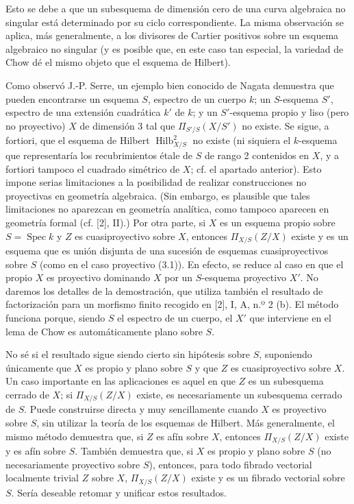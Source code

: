 Esto se debe a que un subesquema de dimensión cero de una curva algebraica no
singular está determinado por su ciclo correspondiente. La misma observación
se aplica, más generalmente, a los divisores de Cartier positivos sobre un
esquema algebraico no singular (y es posible que, en este caso tan especial,
la variedad de Chow dé el mismo objeto que el esquema de Hilbert).


Como observó J.-P. Serre, un ejemplo bien conocido de Nagata demuestra que
pueden encontrarse un esquema $S$, espectro de un cuerpo $k$; un $S$-esquema
$S'$, espectro de una extensión cuadrática $k'$ de $k$; y un $S'$-esquema
propio y liso (pero no proyectivo) $X$ de dimensión 3 tal que
$\Pi_{S'/S}(X/S')$ no existe. Se sigue, a fortiori, que el esquema de
Hilbert $\operatorname{Hilb}^2_{X/S}$ no existe (ni siquiera el $k$-esquema
que representaría los recubrimientos étale de $S$ de rango 2 contenidos en
$X$, y a fortiori tampoco el cuadrado simétrico de $X$; cf. el apartado
anterior). Esto impone serias limitaciones a la posibilidad de realizar
construcciones no proyectivas en geometría algebraica. (Sin embargo, es
plausible que tales limitaciones no aparezcan en geometría analítica, como
tampoco aparecen en geometría formal (cf. [2], II).) Por otra parte, si $X$ es
un esquema propio sobre $S=\operatorname{Spec}k$ y $Z$ es cuasiproyectivo
sobre $X$, entonces $\Pi_{X/S}(Z/X)$ existe y es un esquema que es unión
disjunta de una sucesión de esquemas cuasiproyectivos sobre $S$ (como en el
caso proyectivo (3.1)). En efecto, se reduce al caso en que el propio $X$ es
proyectivo dominando $X$ por un $S$-esquema proyectivo $X'$. No daremos los
detalles de la demostración, que utiliza también el resultado de factorización
para un morfismo finito recogido en [2], I, A, n.º 2 (b). El método funciona
porque, siendo $S$ el espectro de un cuerpo, el $X'$ que interviene en el lema
de Chow es automáticamente plano sobre $S$.

No sé si el resultado sigue siendo cierto sin hipótesis sobre $S$, suponiendo
únicamente que $X$ es propio y plano sobre $S$ y que $Z$ es cuasiproyectivo
sobre $X$. Un caso importante en las aplicaciones es aquel en que $Z$ es un
subesquema cerrado de $X$; si $\Pi_{X/S}(Z/X)$ existe, es necesariamente un
subesquema cerrado de $S$. Puede
construirse directa y muy sencillamente cuando $X$ es proyectivo sobre $S$,
sin utilizar la teoría de los esquemas de Hilbert. Más generalmente, el mismo
método demuestra que, si $Z$ es afín sobre $X$, entonces $\Pi_{X/S}(Z/X)$
existe y es afín sobre $S$. También demuestra que, si $X$ es propio y plano
sobre $S$ (no necesariamente proyectivo sobre $S$), entonces, para todo
fibrado vectorial localmente trivial $Z$ sobre $X$, $\Pi_{X/S}(Z/X)$ existe y
es un fibrado vectorial sobre $S$. Sería deseable retomar y unificar estos
resultados.

